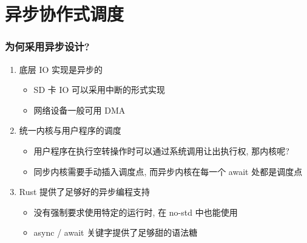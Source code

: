 \section{异步协作式调度}

\begin{frame}
    \frametitle{为何采用异步设计?}

    \begin{enumerate}
        \item 底层 IO 实现是异步的
              \begin{itemize}
                  \item SD 卡 IO 可以采用中断的形式实现
                  \item 网络设备一般可用 DMA
              \end{itemize}
        \item 统一内核与用户程序的调度
              \begin{itemize}
                  \item 用户程序在执行空转操作时可以通过系统调用让出执行权, 那内核呢?
                  \item 同步内核需要手动插入调度点, 而异步内核在每一个 await 处都是调度点
              \end{itemize}
        \item Rust 提供了足够好的异步编程支持
              \begin{itemize}
                  \item 没有强制要求使用特定的运行时, 在 no-std 中也能使用
                  \item async / await 关键字提供了足够甜的语法糖
              \end{itemize}
    \end{enumerate}
\end{frame}

